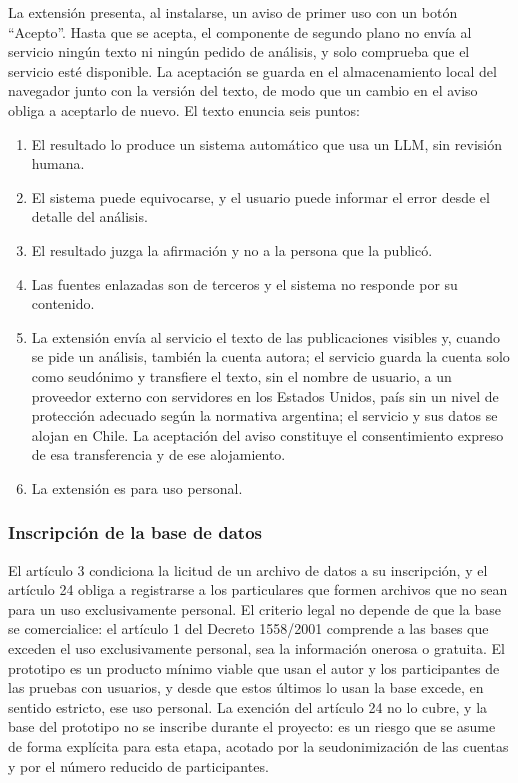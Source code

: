 La extensión presenta, al instalarse, un aviso de primer uso con un botón \enquote{Acepto}. Hasta que se acepta, el componente de segundo plano no envía al servicio ningún texto ni ningún pedido de análisis, y solo comprueba que el servicio esté disponible. La aceptación se guarda en el almacenamiento local del navegador junto con la versión del texto, de modo que un cambio en el aviso obliga a aceptarlo de nuevo. El texto enuncia seis puntos:

\begin{enumerate}
  \item El resultado lo produce un sistema automático que usa un LLM, sin revisión humana.
  \item El sistema puede equivocarse, y el usuario puede informar el error desde el detalle del análisis.
  \item El resultado juzga la afirmación y no a la persona que la publicó.
  \item Las fuentes enlazadas son de terceros y el sistema no responde por su contenido.
  \item La extensión envía al servicio el texto de las publicaciones visibles y, cuando se pide un análisis, también la cuenta autora; el servicio guarda la cuenta solo como seudónimo y transfiere el texto, sin el nombre de usuario, a un proveedor externo con servidores en los Estados Unidos, país sin un nivel de protección adecuado según la normativa argentina; el servicio y sus datos se alojan en Chile. La aceptación del aviso constituye el consentimiento expreso de esa transferencia y de ese alojamiento.
  \item La extensión es para uso personal.
\end{enumerate}

\subsubsection{Inscripción de la base de datos}

El artículo 3 condiciona la licitud de un archivo de datos a su inscripción, y el artículo 24 obliga a registrarse a los particulares que formen archivos que no sean para un uso exclusivamente personal. El criterio legal no depende de que la base se comercialice: el artículo 1 del Decreto 1558/2001 comprende a las bases que exceden el uso exclusivamente personal, sea la información onerosa o gratuita. El prototipo es un producto mínimo viable que usan el autor y los participantes de las pruebas con usuarios, y desde que estos últimos lo usan la base excede, en sentido estricto, ese uso personal. La exención del artículo 24 no lo cubre, y la base del prototipo no se inscribe durante el proyecto: es un riesgo que se asume de forma explícita para esta etapa, acotado por la seudonimización de las cuentas y por el número reducido de participantes.

